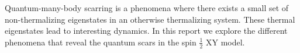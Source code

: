 


\begin{abstracts}        %

\setlength{\parindent}{17.62482pt}
\setlength{\parskip}{0.0pt plus 1.0pt}
Quantum-many-body scarring is a phenomena where there exists a small set of non-thermalizing eigenstates in an otherwise thermalizing system. These  thermal eigenstates lead to interesting dynamics. In this report we explore the different phenomena that reveal the quantum scars in the spin $\frac 1 2 $ XY model. 


\end{abstracts}


